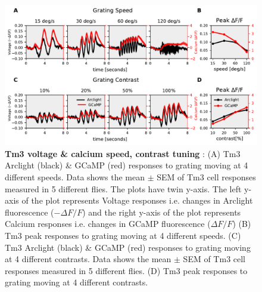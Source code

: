 \documentclass[9pt,lineno]{elife}
\begin{document}
\begin{figure}
\begin{fullwidth}
\includegraphics[width=0.84\linewidth]{figure8}
\caption{\textbf{Tm3 voltage \& calcium speed, contrast tuning} : (A) Tm3 Arclight (black) \& GCaMP (red) responses to grating moving at 4 different speeds. Data shows the mean $\pm$ SEM of Tm3 cell responses measured in 5 different flies. The plots have twin y-axis. The left y-axis of the plot represents Voltage responses i.e. changes in Arclight fluorescence ($-\Delta F/F$) and the right y-axis of the plot represents Calcium responses i.e. changes in GCaMP fluorescence ($\Delta F/F$) (B) Tm3 peak responses to grating moving at 4 different speeds. (C) Tm3 Arclight (black) \& GCaMP (red) responses to grating moving at 4 different contrasts. Data shows the mean $\pm$ SEM of Tm3 cell responses measured in 5 different flies. (D) Tm3 peak responses to grating moving at 4 different contrasts.}

\label{Tm3data}
	
\end{fullwidth}
\end{figure} 
\end{document}
